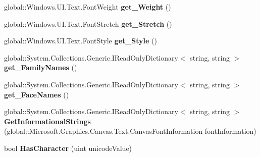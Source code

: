 \begin{DoxyCompactItemize}
global\+::\+Windows.\+U\+I.\+Text.\+Font\+Weight {\bfseries get\+\_\+\+Weight} ()
\item 
\mbox{\label{class_microsoft_1_1_graphics_1_1_canvas_1_1_text_1_1_canvas_font_face_afc817833624035a09fff8a257d78d128}} 
global\+::\+Windows.\+U\+I.\+Text.\+Font\+Stretch {\bfseries get\+\_\+\+Stretch} ()
\item 
\mbox{\label{class_microsoft_1_1_graphics_1_1_canvas_1_1_text_1_1_canvas_font_face_a0b4496612ddddab6cfa3a98eb00e5ba6}} 
global\+::\+Windows.\+U\+I.\+Text.\+Font\+Style {\bfseries get\+\_\+\+Style} ()
\item 
\mbox{\label{class_microsoft_1_1_graphics_1_1_canvas_1_1_text_1_1_canvas_font_face_a62fb160f2223f3cc2c7cbcfa07253e25}} 
global\+::\+System.\+Collections.\+Generic.\+I\+Read\+Only\+Dictionary$<$ string, string $>$ {\bfseries get\+\_\+\+Family\+Names} ()
\item 
\mbox{\label{class_microsoft_1_1_graphics_1_1_canvas_1_1_text_1_1_canvas_font_face_a236b4e875d007d787787ef9a495dd420}} 
global\+::\+System.\+Collections.\+Generic.\+I\+Read\+Only\+Dictionary$<$ string, string $>$ {\bfseries get\+\_\+\+Face\+Names} ()
\item 
\mbox{\label{class_microsoft_1_1_graphics_1_1_canvas_1_1_text_1_1_canvas_font_face_ad17fe050928eabac16474acb5cf094c7}} 
global\+::\+System.\+Collections.\+Generic.\+I\+Read\+Only\+Dictionary$<$ string, string $>$ {\bfseries Get\+Informational\+Strings} (global\+::\+Microsoft.\+Graphics.\+Canvas.\+Text.\+Canvas\+Font\+Information font\+Information)
\item 
\mbox{\label{class_microsoft_1_1_graphics_1_1_canvas_1_1_text_1_1_canvas_font_face_a3b88a765888bcc02c633c1c7ec657e8a}} 
bool {\bfseries Has\+Character} (uint unicode\+Value)
\item 
\mbox{\label{class_microsoft_1_1_graphics_1_1_canvas_1_1_text_1_1_canvas_font_face_aded9ca216e31cb6401b5b09d6da6042b}} 

\end{DoxyCompactItemize}
